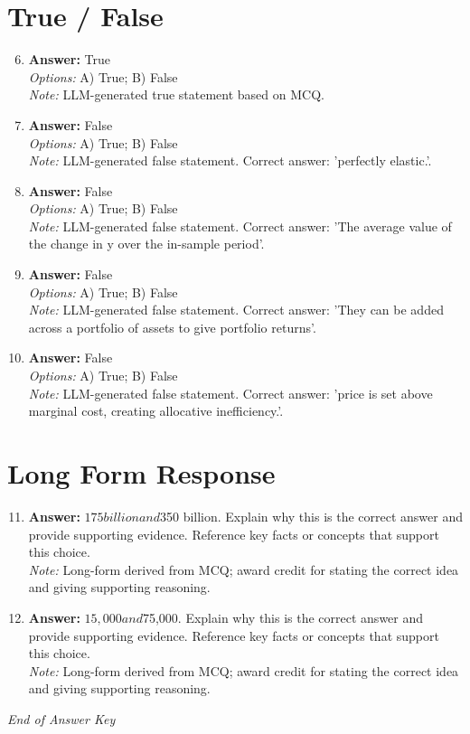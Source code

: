 \documentclass[12pt]{article}
\begin{document}
\section*{True / False}
\begin{enumerate}[label=\arabic*.]
\setcounter{enumi}{5}
\item \textbf{Answer:} True
\\ \textit{Options:} A) True; B) False
\\ \textit{Note:} LLM-generated true statement based on MCQ.
\item \textbf{Answer:} False
\\ \textit{Options:} A) True; B) False
\\ \textit{Note:} LLM-generated false statement. Correct answer: 'perfectly elastic.'.
\item \textbf{Answer:} False
\\ \textit{Options:} A) True; B) False
\\ \textit{Note:} LLM-generated false statement. Correct answer: 'The average value of the change in y over the in-sample period'.
\item \textbf{Answer:} False
\\ \textit{Options:} A) True; B) False
\\ \textit{Note:} LLM-generated false statement. Correct answer: 'They can be added across a portfolio of assets to give portfolio returns'.
\item \textbf{Answer:} False
\\ \textit{Options:} A) True; B) False
\\ \textit{Note:} LLM-generated false statement. Correct answer: 'price is set above marginal cost, creating allocative inefficiency.'.
\end{enumerate}

\section*{Long Form Response}
\begin{enumerate}[label=\arabic*.]
\setcounter{enumi}{10}
\item \textbf{Answer:} $175 billion and $350 billion. Explain why this is the correct answer and provide supporting evidence. Reference key facts or concepts that support this choice.
\\ \textit{Note:} Long-form derived from MCQ; award credit for stating the correct idea and giving supporting reasoning.
\item \textbf{Answer:} $15,000 and $75,000. Explain why this is the correct answer and provide supporting evidence. Reference key facts or concepts that support this choice.
\\ \textit{Note:} Long-form derived from MCQ; award credit for stating the correct idea and giving supporting reasoning.
\end{enumerate}

\vfill
\noindent\textit{End of Answer Key}
\end{document}
